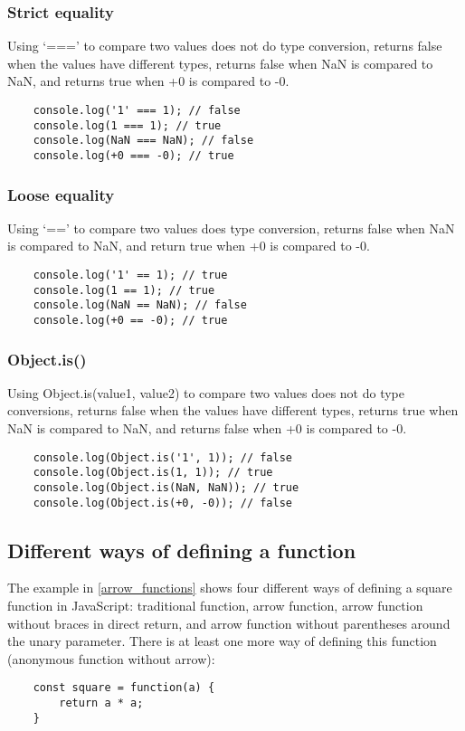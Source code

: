 \documentclass[11pt,a4paper]{article}
\begin{document}
\subsubsection{Strict equality}
Using `===' to compare two values does not do type conversion,
returns false when the values have different types,
returns false when NaN is compared to NaN,
and returns true when +0 is compared to -0.
\begin{verbatim}
    console.log('1' === 1); // false
    console.log(1 === 1); // true
    console.log(NaN === NaN); // false
    console.log(+0 === -0); // true
\end{verbatim}

\subsubsection{Loose equality}
Using `==' to compare two values does type conversion,
returns false when NaN is compared to NaN,
and return true when +0 is compared to -0.
\begin{verbatim}
    console.log('1' == 1); // true
    console.log(1 == 1); // true
    console.log(NaN == NaN); // false
    console.log(+0 == -0); // true
\end{verbatim}

\subsubsection{Object.is()}
Using Object.is(value1, value2) to compare two values does not do type conversions,
returns false when the values have different types,
returns true when NaN is compared to NaN,
and returns false when +0 is compared to -0.
\begin{verbatim}
    console.log(Object.is('1', 1)); // false
    console.log(Object.is(1, 1)); // true
    console.log(Object.is(NaN, NaN)); // true
    console.log(Object.is(+0, -0)); // false
\end{verbatim}

\subsection{Different ways of defining a function}
The example in \ref{arrow_functions} shows four different ways of defining a square function in JavaScript:
traditional function, arrow function, arrow function without braces in direct return,
and arrow function without parentheses around the unary parameter.
There is at least one more way of defining this function (anonymous function without arrow):
\begin{verbatim}
    const square = function(a) {
        return a * a;
    }
\end{verbatim}
\end{document}
